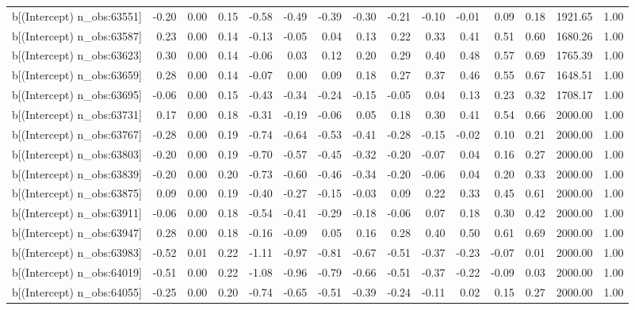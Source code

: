 \begin{table}[ht]
\begin{tabular}{rrrrrrrrrrrrrrr}
  b[(Intercept) n\_obs:63551] & -0.20 & 0.00 & 0.15 & -0.58 & -0.49 & -0.39 & -0.30 & -0.21 & -0.10 & -0.01 & 0.09 & 0.18 & 1921.65 & 1.00 \\ 
  b[(Intercept) n\_obs:63587] & 0.23 & 0.00 & 0.14 & -0.13 & -0.05 & 0.04 & 0.13 & 0.22 & 0.33 & 0.41 & 0.51 & 0.60 & 1680.26 & 1.00 \\ 
  b[(Intercept) n\_obs:63623] & 0.30 & 0.00 & 0.14 & -0.06 & 0.03 & 0.12 & 0.20 & 0.29 & 0.40 & 0.48 & 0.57 & 0.69 & 1765.39 & 1.00 \\ 
  b[(Intercept) n\_obs:63659] & 0.28 & 0.00 & 0.14 & -0.07 & 0.00 & 0.09 & 0.18 & 0.27 & 0.37 & 0.46 & 0.55 & 0.67 & 1648.51 & 1.00 \\ 
  b[(Intercept) n\_obs:63695] & -0.06 & 0.00 & 0.15 & -0.43 & -0.34 & -0.24 & -0.15 & -0.05 & 0.04 & 0.13 & 0.23 & 0.32 & 1708.17 & 1.00 \\ 
  b[(Intercept) n\_obs:63731] & 0.17 & 0.00 & 0.18 & -0.31 & -0.19 & -0.06 & 0.05 & 0.18 & 0.30 & 0.41 & 0.54 & 0.66 & 2000.00 & 1.00 \\ 
  b[(Intercept) n\_obs:63767] & -0.28 & 0.00 & 0.19 & -0.74 & -0.64 & -0.53 & -0.41 & -0.28 & -0.15 & -0.02 & 0.10 & 0.21 & 2000.00 & 1.00 \\ 
  b[(Intercept) n\_obs:63803] & -0.20 & 0.00 & 0.19 & -0.70 & -0.57 & -0.45 & -0.32 & -0.20 & -0.07 & 0.04 & 0.16 & 0.27 & 2000.00 & 1.00 \\ 
  b[(Intercept) n\_obs:63839] & -0.20 & 0.00 & 0.20 & -0.73 & -0.60 & -0.46 & -0.34 & -0.20 & -0.06 & 0.04 & 0.20 & 0.33 & 2000.00 & 1.00 \\ 
  b[(Intercept) n\_obs:63875] & 0.09 & 0.00 & 0.19 & -0.40 & -0.27 & -0.15 & -0.03 & 0.09 & 0.22 & 0.33 & 0.45 & 0.61 & 2000.00 & 1.00 \\ 
  b[(Intercept) n\_obs:63911] & -0.06 & 0.00 & 0.18 & -0.54 & -0.41 & -0.29 & -0.18 & -0.06 & 0.07 & 0.18 & 0.30 & 0.42 & 2000.00 & 1.00 \\ 
  b[(Intercept) n\_obs:63947] & 0.28 & 0.00 & 0.18 & -0.16 & -0.09 & 0.05 & 0.16 & 0.28 & 0.40 & 0.50 & 0.61 & 0.69 & 2000.00 & 1.00 \\ 
  b[(Intercept) n\_obs:63983] & -0.52 & 0.01 & 0.22 & -1.11 & -0.97 & -0.81 & -0.67 & -0.51 & -0.37 & -0.23 & -0.07 & 0.01 & 2000.00 & 1.00 \\ 
  b[(Intercept) n\_obs:64019] & -0.51 & 0.00 & 0.22 & -1.08 & -0.96 & -0.79 & -0.66 & -0.51 & -0.37 & -0.22 & -0.09 & 0.03 & 2000.00 & 1.00 \\ 
  b[(Intercept) n\_obs:64055] & -0.25 & 0.00 & 0.20 & -0.74 & -0.65 & -0.51 & -0.39 & -0.24 & -0.11 & 0.02 & 0.15 & 0.27 & 2000.00 & 1.00 \\ 

\end{tabular}
\end{table}
